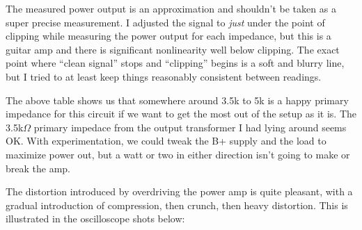 \documentclass[pdftex,letterpaper,11pt]{article}
\begin{document}
The measured power output is an approximation and shouldn't be taken as a super precise measurement. I adjusted the signal to \textit{just} under the point of clipping while measuring the power output for each impedance, but this is a guitar amp and there is significant nonlinearity well below clipping. The exact point where ``clean signal'' stops and ``clipping'' begins is a soft and blurry line, but I tried to at least keep things reasonably consistent between readings. 

The above table shows us that somewhere around 3.5k to 5k is a happy primary impedance for this circuit if we want to get the most out of the setup as it is. The 3.5k$\Omega$ primary impedace from the output transformer I had lying around seems OK. With experimentation, we could tweak the B+ supply and the load to maximize power out, but a watt or two in either direction isn't going to make or break the amp.

The distortion introduced by overdriving the power amp is quite pleasant, with a gradual introduction of compression, then crunch, then heavy distortion. This is illustrated in the oscilloscope shots below:

\begin{figure}[H]
    \centering
    \qquad
    
    \qquad
\end{figure}
\end{document}
